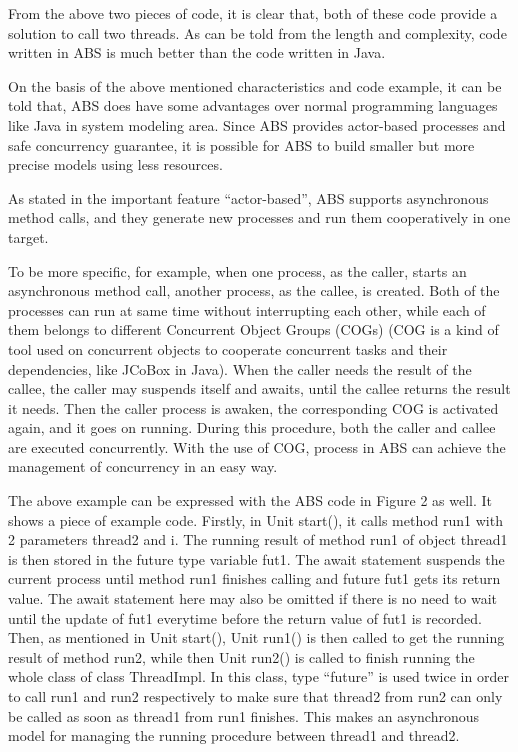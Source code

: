 \documentclass[article,dr=phil,type=msc,colorback,accentcolor=tud9c]{tudthesis}
\begin{document}
\begin{itemize}
  From the above two pieces of code, it is clear that, both of these code provide a solution to call two threads. As can be told from the length and complexity, code written in ABS is much better than the code written in Java.
  
  On the basis of the above mentioned characteristics and code example, it can be told that, ABS does have some advantages over normal programming languages like Java in system modeling area. Since ABS provides actor-based processes and safe concurrency guarantee, it is possible for ABS to build smaller but more precise models using less resources.
  
  \end{itemize}

  As stated in the important feature ``actor-based'', ABS supports asynchronous method calls, and they generate new processes and run them cooperatively in one target. 
  
  To be more specific, for example, when one process, as the caller, starts an asynchronous method call, another process, as the callee, is created. Both of the processes can run at same time without interrupting each other, while each of them belongs to different Concurrent Object Groups (COGs) (COG is a kind of tool used on concurrent objects to cooperate concurrent tasks and their dependencies, like JCoBox in Java). When the caller needs the result of the callee, the caller may suspends itself and awaits, until the callee returns the result it needs. Then the caller process is awaken, the corresponding COG is activated again, and it goes on running. During this procedure, both the caller and callee are executed concurrently. With the use of COG, process in ABS can achieve the management of concurrency in an easy way.\cite{hahnle2012abstract}
  
  The above example can be expressed with the ABS code in Figure 2 as well.
  It shows a piece of example code. Firstly, in Unit start(), it calls method run1 with 2 parameters thread2 and i. The running result of method run1 of object thread1 is then stored in the future type variable fut1. The await statement suspends the current process until method run1 finishes calling and future fut1 gets its return value. The await statement here may also be omitted if there is no need to wait until the update of fut1 everytime before the return value of fut1 is recorded. Then, as mentioned in Unit start(), Unit run1() is then called to get the running result of method run2, while then Unit run2() is called to finish running the whole class of class ThreadImpl. In this class, type ``future'' is used twice in order to call run1 and run2 respectively to make sure that thread2 from run2 can only be called as soon as thread1 from run1 finishes. This makes an asynchronous model for managing the running procedure between thread1 and thread2.
  
\end{document}
